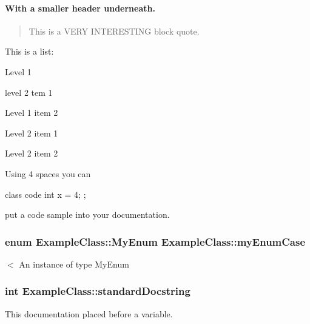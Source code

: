 \paragraph*{With a smaller header underneath.}





\begin{quote}
This is a V\+E\+R\+Y I\+N\+T\+E\+R\+E\+S\+T\+I\+N\+G block quote. \end{quote}




This is a list\+:
\begin{DoxyItemize}
\item Level 1
\begin{DoxyItemize}
\item level 2 tem 1
\end{DoxyItemize}
\item Level 1 item 2
\begin{DoxyItemize}
\item Level 2 item 1
\item Level 2 item 2
\end{DoxyItemize}
\end{DoxyItemize}





Using 4 spaces you can \begin{DoxyVerb}class code
{
  int x = 4;
};
\end{DoxyVerb}


put a code sample into your documentation. 

 \hypertarget{class_example_class_afcd68bb9793b264f120c39058cab7c0f}{}
\subsubsection[{my\+Enum\+Case}]{\setlength{\rightskip}{0pt plus 5cm}enum {\bf Example\+Class\+::\+My\+Enum}  Example\+Class\+::my\+Enum\+Case}\label{class_example_class_afcd68bb9793b264f120c39058cab7c0f}
$<$ An instance of type My\+Enum \hypertarget{class_example_class_a0b61c0174aff35afaca216512f535f6f}{}
\subsubsection[{standard\+Docstring}]{\setlength{\rightskip}{0pt plus 5cm}int Example\+Class\+::standard\+Docstring}\label{class_example_class_a0b61c0174aff35afaca216512f535f6f}
This documentation placed before a variable. 

